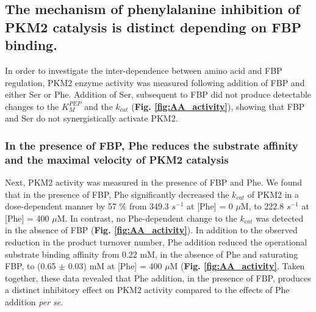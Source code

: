 \subsection{The mechanism of phenylalanine inhibition of PKM2 catalysis is distinct depending on FBP binding.}
\label{subsec:phe_activity_mechanism}
In order to investigate the inter-dependence between amino acid and FBP regulation, PKM2 enzyme activity was measured following addition of FBP and either Ser or Phe. Addition of Ser, subsequent to FBP did not produce detectable changes to the $K_{M}^{PEP}$ and the $k_{cat}$ (\textbf{Fig. \ref{fig:AA_activity}}), showing that FBP and Ser do not synergistically activate PKM2.

\subsubsection{In the presence of FBP, Phe reduces the substrate affinity and the maximal velocity of PKM2 catalysis}
Next, PKM2 activity was measured in the presence of FBP and Phe. We found that in the presence of FBP, Phe significantly decreased the $k_{cat}$ of PKM2 in a dose-dependent manner by 57 \% from 349.3 $s^{-1}$ at [Phe] = 0 $\mu$M, to 222.8 $s^{-1}$ at [Phe] = 400 $\mu$M. In contrast, no Phe-dependent change to the $k_{cat}$ was detected in the absence of FBP (\textbf{Fig. \ref{fig:AA_activity}}). In addition to the observed reduction in the product turnover number, Phe addition reduced the operational substrate binding affinity from 0.22 mM, in the absence of Phe and saturating FBP, to (0.65 $\pm$ 0.03) mM at [Phe] = 400 $\mu$M (\textbf{Fig. \ref{fig:AA_activity}}. Taken together, these data revealed that Phe addition, in the presence of FBP, produces a distinct inhibitory effect on PKM2 activity compared to the effects of Phe addition \textit{per se}.


